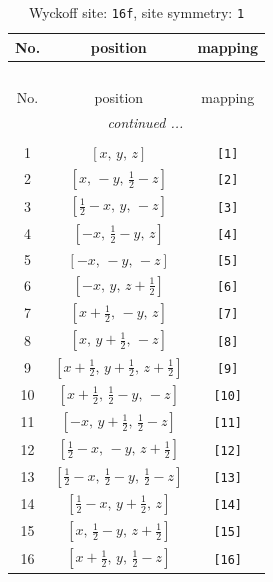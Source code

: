 \documentclass[fleqn,8pt]{jsarticle}
\begin{document}
\begin{longtable}{ccc}
\caption{Wyckoff site: {\tt 16f}, site symmetry: {\tt 1}}
 \\
 \hline \hline
No. & position & mapping \\ \hline \endfirsthead

\multicolumn{2}{l}{\tablename\ \thetable{}} \\
 \hline \hline
No. & position & mapping \\ \hline \endhead

 \hline \hline
\multicolumn{2}{r}{\footnotesize\it continued ...} \\ \endfoot

 \hline \hline
\multicolumn{2}{r}{} \\ \endlastfoot

1 & $\left[ x,\, y,\, z \right]$ & {\tt [1]} \\ \hline
2 & $\left[ x,\, - y,\, \frac{1}{2} - z \right]$ & {\tt [2]} \\ \hline
3 & $\left[ \frac{1}{2} - x,\, y,\, - z \right]$ & {\tt [3]} \\ \hline
4 & $\left[ - x,\, \frac{1}{2} - y,\, z \right]$ & {\tt [4]} \\ \hline
5 & $\left[ - x,\, - y,\, - z \right]$ & {\tt [5]} \\ \hline
6 & $\left[ - x,\, y,\, z + \frac{1}{2} \right]$ & {\tt [6]} \\ \hline
7 & $\left[ x + \frac{1}{2},\, - y,\, z \right]$ & {\tt [7]} \\ \hline
8 & $\left[ x,\, y + \frac{1}{2},\, - z \right]$ & {\tt [8]} \\ \hline
9 & $\left[ x + \frac{1}{2},\, y + \frac{1}{2},\, z + \frac{1}{2} \right]$ & {\tt [9]} \\ \hline
10 & $\left[ x + \frac{1}{2},\, \frac{1}{2} - y,\, - z \right]$ & {\tt [10]} \\ \hline
11 & $\left[ - x,\, y + \frac{1}{2},\, \frac{1}{2} - z \right]$ & {\tt [11]} \\ \hline
12 & $\left[ \frac{1}{2} - x,\, - y,\, z + \frac{1}{2} \right]$ & {\tt [12]} \\ \hline
13 & $\left[ \frac{1}{2} - x,\, \frac{1}{2} - y,\, \frac{1}{2} - z \right]$ & {\tt [13]} \\ \hline
14 & $\left[ \frac{1}{2} - x,\, y + \frac{1}{2},\, z \right]$ & {\tt [14]} \\ \hline
15 & $\left[ x,\, \frac{1}{2} - y,\, z + \frac{1}{2} \right]$ & {\tt [15]} \\ \hline
16 & $\left[ x + \frac{1}{2},\, y,\, \frac{1}{2} - z \right]$ & {\tt [16]} \\
\end{longtable}
\end{document}
